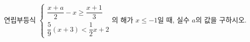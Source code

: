 연립부등식 $\begin{cases} \dfrac{x+a}{2}-x\ge \dfrac{x+1}{3} \\ \dfrac{5}{9}(x+3)<\dfrac{1}{2}x+2 \end{cases}$의 해가 $x\le -1$일 때, 실수 $a$의 값을 구하시오.
